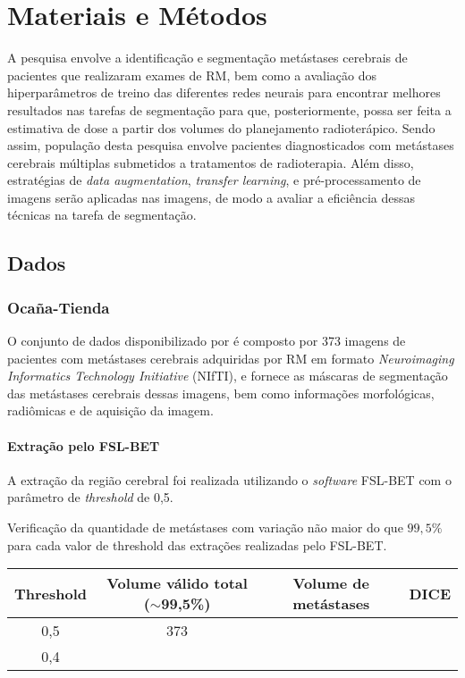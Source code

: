 
\chapter{Materiais e Métodos}\label{chap:metodos}


A pesquisa envolve a identificação e segmentação metástases cerebrais de pacientes que realizaram exames de RM, bem como a avaliação dos hiperparâmetros de treino das diferentes redes neurais para encontrar melhores resultados nas tarefas de segmentação para que, posteriormente, possa ser feita a estimativa de dose a partir dos volumes do planejamento radioterápico. Sendo assim, população desta pesquisa envolve pacientes diagnosticados com metástases cerebrais múltiplas submetidos a tratamentos de radioterapia. Além disso, estratégias de \textit{data augmentation}, \textit{transfer learning}, e pré-processamento de imagens serão aplicadas nas imagens, de modo a avaliar a eficiência dessas técnicas na tarefa de segmentação.

\section{Dados}

\subsection{Ocaña-Tienda}

O conjunto de dados disponibilizado por \cite{Ocaña-Tienda:2023} é composto por 373 imagens de pacientes com metástases cerebrais adquiridas por RM em formato \textit{Neuroimaging Informatics Technology Initiative} (NIfTI), e fornece as máscaras de segmentação das metástases cerebrais dessas imagens, bem como informações morfológicas, radiômicas e de aquisição da imagem.

\subsubsection{Extração pelo FSL-BET}

A extração da região cerebral foi realizada utilizando o \textit{software} FSL-BET com o parâmetro de \textit{threshold} de 0,5.

Verificação da quantidade de metástases com variação não maior do que $99,5\%$ para cada valor de threshold das extrações realizadas pelo FSL-BET.

\begin{table}[ht]
\centering
\begin{tabular}{|c|c|c|c|}
\hline
Threshold & Volume válido total ($\sim$99,5\%) & Volume de metástases & DICE \\ \hline
0,5       & 373                                    &                      &      \\ \hline
0,4       &                                    &                      &      \\ \hline
\end{tabular}
\end{table}

